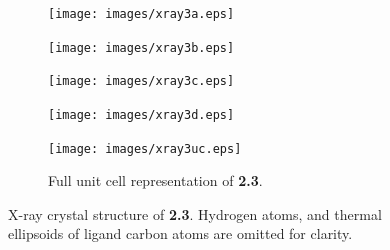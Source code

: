 \begin{figure}[!ht]
 \centering
 \begin{subfigure}[b]{0.49\textwidth}
  \texttt{[image: images/xray3a.eps]}
 \end{subfigure}
 \begin{subfigure}[b]{0.49\textwidth}
  \texttt{[image: images/xray3b.eps]}
 \end{subfigure}
 \begin{subfigure}[b]{0.49\textwidth}
  \texttt{[image: images/xray3c.eps]}
 \end{subfigure}
 \begin{subfigure}[b]{0.49\textwidth}
  \texttt{[image: images/xray3d.eps]}
 \end{subfigure}
 \begin{subfigure}[b]{\textwidth}
  \centering
  \texttt{[image: images/xray3uc.eps]}
  \caption{Full unit cell representation of \textbf{2.3}.}
 \end{subfigure}
\caption[X-ray crystal structure of \textbf{2.3}.]{X-ray crystal structure of \textbf{2.3}. Hydrogen atoms, and thermal ellipsoids of ligand carbon atoms are omitted for clarity.}
\label{fig.xray23}
\end{figure}


